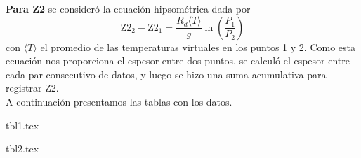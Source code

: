 \documentclass[class=article,crop=false]{standalone}
\begin{document}
\begin{enumerate}[a)]
\textbf{Para Z2} se consideró la ecuación hipsométrica dada por
\begin{equation}
\text{Z2}_2 - \text{Z2}_1 = \frac{R_d \langle T \rangle }{g} \ln\left(\frac{P_1}{P_2}\right) 
\end{equation}
con $\langle T \rangle$ el promedio de las temperaturas virtuales en los puntos 1 y 2. Como esta ecuación nos proporciona el espesor entre dos puntos, se calculó el espesor entre cada par consecutivo de datos, y luego se hizo una suma acumulativa para registrar Z2. \\

A continuación presentamos las tablas con los datos.



	\captionsetup[table]{font=scriptsize}
	\begin{minipage}{0.49\linewidth}
	\begin{adjustbox}{width=\linewidth}
	{tbl1.tex}
	\end{adjustbox}
	\end{minipage}
	\hfill
	\begin{minipage}{0.49\linewidth}
	\begin{adjustbox}{width=\linewidth}
	{tbl2.tex}
	\end{adjustbox}
	\end{minipage}


\end{enumerate}
\end{document}
